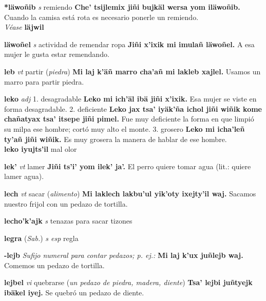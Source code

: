 \documentclass[10pt]{scrbook}
\newcommand{\entry}[1]{\textbf{#1}}
\newcommand{\onedefinition}[1]{#1.}
\newcommand{\nontranslationdef}[1]{\textit{#1}}
\newcommand{\partofspeech}[1]{\textit{#1}}
\newcommand{\spanishtranslation}[1]{#1}
\newcommand{\clarification}[1]{(\textit{#1})}
\newcommand{\cholexample}[1]{\textbf{#1}}
\newcommand{\exampletranslation}[1]{#1}
\newcommand{\alsosee}[1]{\\\textit{Véase} \textbf{#1}}
\newcommand{\relevantdialect}[1]{(\textit{#1})}
\newcommand{\secondaryentry}[1]{\\\textbf{#1}}
\newcommand{\secondtranslation}[1]{#1}
\begin{document}
\begin{multicols}{2}
\entry{*läwoñib}
\partofspeech{s}
\spanishtranslation{remiendo}
\cholexample{Che' tsijlemix jiñi bujkäl wersa yom iläwoñib.}
\exampletranslation{Cuando la camisa está rota es necesario ponerle un remiendo.}
\alsosee{läjwil}

\entry{läwoñel}
\partofspeech{s}
\spanishtranslation{actividad de remendar ropa}
\cholexample{Jiñi x'ixik mi imulañ läwoñel.}
\exampletranslation{A esa mujer le gusta estar remendando.}

\entry{leb}
\partofspeech{vt}
\spanishtranslation{partir}
\clarification{piedra}
\cholexample{Mi laj k'äñ marro cha'añ mi lakleb xajlel.}
\exampletranslation{Usamos un marro para partir piedra.}

\entry{leko}
\partofspeech{adj}
\onedefinition{1}
\spanishtranslation{desagradable}
\cholexample{Leko mi ich'äl ibä jiñi x'ixik.}
\exampletranslation{Esa mujer se viste en forma desagradable.}
\onedefinition{2}
\spanishtranslation{deficiente}
\cholexample{Leko jax tsa' iyäk'ña ichol jiñi wiñik kome chañatyax tsa' itsepe jiñi pimel.}
\exampletranslation{Fue muy deficiente la forma en que limpió su milpa ese hombre; cortó muy alto el monte.}
\onedefinition{3}
\spanishtranslation{grosero}
\cholexample{Leko mi icha'leñ ty'añ jiñi wiñik.}
\exampletranslation{Es muy grosera la manera de hablar de ese hombre.}
\secondaryentry{leko iyujts'il}
\secondtranslation{mal olor}

\entry{lek'}
\partofspeech{vt}
\spanishtranslation{lamer}
\cholexample{Jiñi ts'i' yom ilek' ja'.}
\exampletranslation{El perro quiere tomar agua (lit.: quiere lamer agua).}

\entry{lech}
\partofspeech{vt}
\spanishtranslation{sacar}
\clarification{alimento}
\cholexample{Mi laklech lakbu'ul yik'oty ixejty'il waj.}
\exampletranslation{Sacamos nuestro frijol con un pedazo de tortilla.}

\entry{lecho'k'ajk}
\partofspeech{s}
\spanishtranslation{tenazas para sacar tizones}

\entry{legra}
\relevantdialect{Sab.}
\partofspeech{s esp}
\spanishtranslation{regla}

\entry{-lejb}
\nontranslationdef{Sufijo numeral para contar pedazos; p. ej.:}
\cholexample{Mi laj k'ux juñlejb waj.}
\exampletranslation{Comemos un pedazo de tortilla.}

\entry{lejbel}
\partofspeech{vi}
\spanishtranslation{quebrarse}
\clarification{un pedazo de piedra, madera, diente}
\cholexample{Tsa' lejbi juñtyejk ibäkel iyej.}
\exampletranslation{Se quebró un pedazo de diente.}


\end{multicols}
\end{document}
